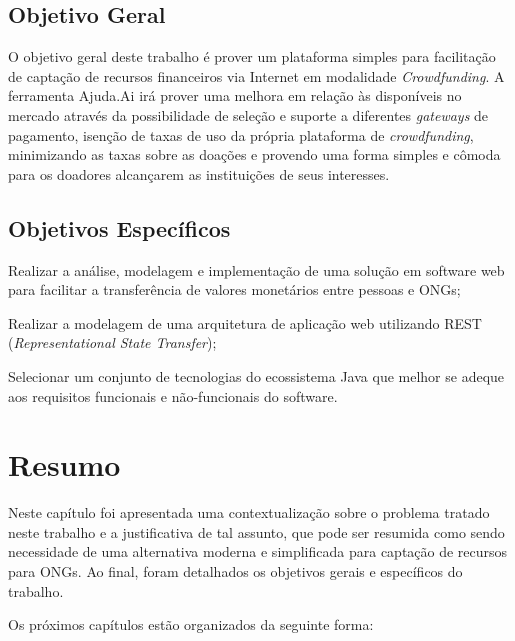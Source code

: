 \subsection{Objetivo Geral}
O objetivo geral deste trabalho é prover um plataforma simples para facilitação de captação de recursos financeiros via Internet em modalidade \emph{Crowdfunding}. A ferramenta Ajuda.Ai irá prover uma melhora em relação às disponíveis no mercado através da possibilidade de seleção e suporte a diferentes \emph{gateways} de pagamento, isenção de taxas de uso da própria plataforma de \emph{crowdfunding}, minimizando as taxas sobre as doações e provendo uma forma simples e cômoda para os doadores alcançarem as instituições de seus interesses.



\subsection{Objetivos Específicos}
\begin{lista}
  \item Realizar a análise, modelagem e implementação de uma solução em software web para facilitar a transferência de valores monetários entre pessoas e ONGs;
  \item Realizar a modelagem de uma arquitetura de aplicação web utilizando REST (\emph{Representational State Transfer});
  \item Selecionar um conjunto de tecnologias do ecossistema Java que melhor se adeque aos requisitos funcionais e não-funcionais do software.
\end{lista}



\section*{Resumo}
Neste capítulo foi apresentada uma contextualização sobre o problema tratado neste trabalho e a justificativa de tal assunto, que pode ser resumida como sendo necessidade de uma alternativa moderna e simplificada para captação de recursos para ONGs. Ao final, foram detalhados os objetivos gerais e específicos do trabalho.

Os próximos capítulos estão organizados da seguinte forma:

